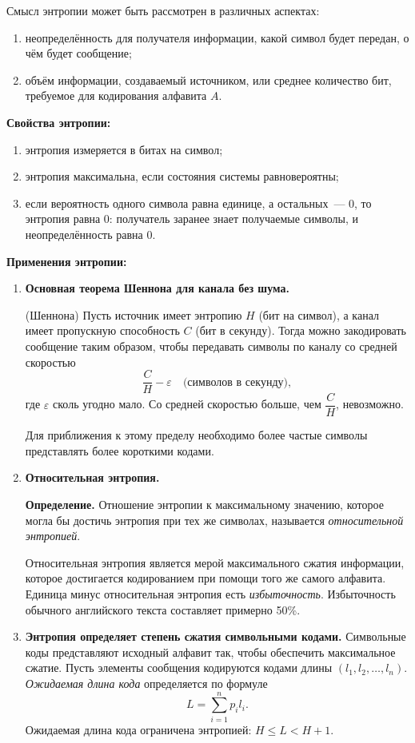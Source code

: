 \documentclass[a4paper,11pt]{article}
\newcommand{\lead}[1]{\textbf{\color{leadcol}#1}\ }
\begin{document}
Смысл энтропии может быть рассмотрен в различных аспектах:
\begin{enumerate}[label=\arabic*)]
  \item неопределённость для получателя информации, какой символ будет передан, о чём будет
        сообщение;
  \item объём информации, создаваемый источником, или среднее количество бит, требуемое для
        кодирования алфавита $A$.
\end{enumerate}

\lead{Свойства энтропии:}
\begin{enumerate}[label=\arabic*)]
  \item энтропия измеряется в битах на символ;
  \item энтропия максимальна, если состояния системы равновероятны;
  \item если вероятность одного символа равна единице, а остальных~--- 0, то энтропия равна 0:
        получатель заранее знает получаемые символы, и неопределённость равна 0.
\end{enumerate}

\lead{Применения энтропии:}
\begin{enumerate}[label=\arabic*)]
\item \textbf{Основная теорема Шеннона для канала без шума.}
\begin{teor}{(Шеннона)}
  Пусть источник имеет энтропию $H$ (бит на символ), а канал имеет пропускную способность $C$
  (бит в секунду). Тогда можно закодировать сообщение таким образом, чтобы передавать символы
  по каналу со средней скоростью
  \[
    \frac{C}{H} - \varepsilon \quad \text{(символов в секунду)},
  \]
  где $\varepsilon$ сколь угодно мало. Со средней скоростью больше, чем $\dfrac{C}{H}$, невозможно.
\end{teor}
Для приближения к этому пределу необходимо более частые символы представлять более короткими кодами.

\item \textbf{Относительная энтропия.}
\begin{opr}
\textbf{Определение.} Отношение энтропии к максимальному значению, которое могла бы достичь
энтропия при тех же символах, называется \emph{относительной энтропией}.
\end{opr}
Относительная энтропия является мерой максимального сжатия информации, которое достигается
кодированием при помощи того же самого алфавита. Единица минус относительная энтропия есть
\emph{избыточность}. Избыточность обычного английского текста составляет примерно 50\%.

\item \textbf{Энтропия определяет степень сжатия символьными кодами.} Символьные коды представляют
исходный алфавит так, чтобы обеспечить максимальное сжатие. Пусть элементы сообщения кодируются
кодами длины $(l_1, l_2, \dots, l_n)$. \emph{Ожидаемая длина кода} определяется по формуле
\[
  L = \sum_{i=1}^{n} p_i l_i.
\]
Ожидаемая длина кода ограничена энтропией: $\boxed{H \le L < H + 1}$.
\end{enumerate}
\end{document}
